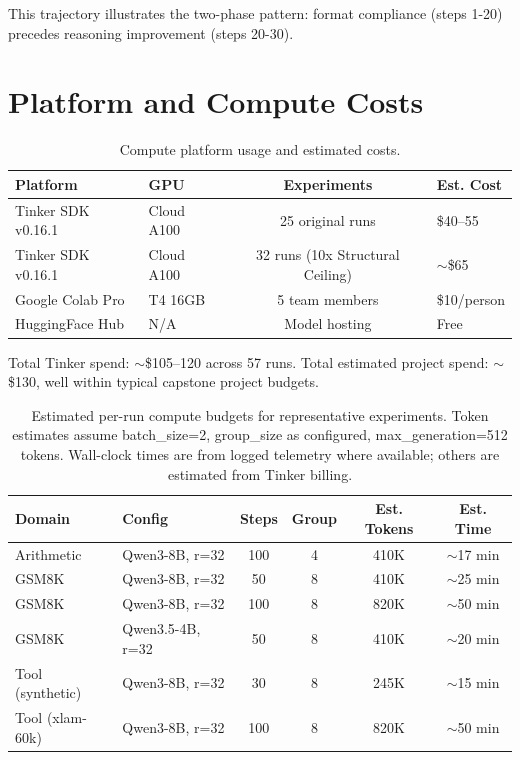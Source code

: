 \documentclass{article}
\begin{document}
This trajectory illustrates the two-phase pattern: format compliance (steps 1-20) precedes reasoning improvement (steps 20-30).

\section{Platform and Compute Costs}

\begin{table}[htbp]
    \centering
    \caption{Compute platform usage and estimated costs.}
    \begin{tabular}{llcl}
        \toprule
        Platform & GPU & Experiments & Est. Cost \\
        \midrule
        Tinker SDK v0.16.1 & Cloud A100 & 25 original runs & \$40--55 \\
        Tinker SDK v0.16.1 & Cloud A100 & 32 runs (10x Structural Ceiling) & $\sim$\$65 \\
        Google Colab Pro & T4 16GB & 5 team members & \$10/person \\
        HuggingFace Hub & N/A & Model hosting & Free \\
        \bottomrule
    \end{tabular}
    \label{tab:compute}
\end{table}

Total Tinker spend: $\sim$\$105--120 across 57 runs. Total estimated project spend: $\sim$\$130, well within typical capstone project budgets.

\begin{table}[htbp]
    \centering
    \caption{Estimated per-run compute budgets for representative experiments. Token estimates assume batch\_size=2, group\_size as configured, max\_generation=512 tokens. Wall-clock times are from logged telemetry where available; others are estimated from Tinker billing.}
    \begin{tabular}{llcccc}
        \toprule
        Domain & Config & Steps & Group & Est. Tokens & Est. Time \\
        \midrule
        Arithmetic & Qwen3-8B, r=32 & 100 & 4 & 410K & $\sim$17 min \\
        GSM8K & Qwen3-8B, r=32 & 50 & 8 & 410K & $\sim$25 min \\
        GSM8K & Qwen3-8B, r=32 & 100 & 8 & 820K & $\sim$50 min \\
        GSM8K & Qwen3.5-4B, r=32 & 50 & 8 & 410K & $\sim$20 min \\
        Tool (synthetic) & Qwen3-8B, r=32 & 30 & 8 & 245K & $\sim$15 min \\
        Tool (xlam-60k) & Qwen3-8B, r=32 & 100 & 8 & 820K & $\sim$50 min \\
        \bottomrule
    \end{tabular}
    \label{tab:per_run_budget}
\end{table}
\end{document}

